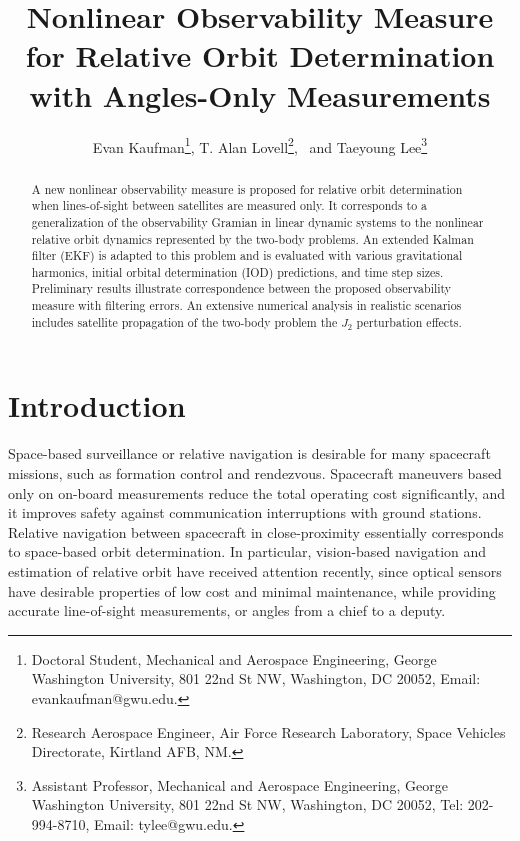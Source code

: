 \documentclass[letterpaper, preprint, paper,11pt]{AAS}	%
\begin{document}
\title{Nonlinear Observability Measure for Relative Orbit Determination with Angles-Only Measurements}

\author{Evan Kaufman\thanks{Doctoral Student, Mechanical and Aerospace Engineering, George Washington University, 801 22nd St NW, Washington, DC 20052, Email: evankaufman@gwu.edu.},  
T. Alan Lovell\thanks{Research Aerospace Engineer, Air Force Research Laboratory, Space Vehicles Directorate, Kirtland AFB, NM.},
\ and Taeyoung Lee\thanks{Assistant Professor, Mechanical and Aerospace Engineering, George Washington University, 801 22nd St NW, Washington, DC 20052, Tel: 202-994-8710, Email: tylee@gwu.edu.}
}


\maketitle{} 		


\begin{abstract}
A new nonlinear observability measure is proposed for relative orbit determination when lines-of-sight between satellites are measured only. It corresponds to a generalization of the observability Gramian in linear dynamic systems to the nonlinear relative orbit dynamics represented by the two-body problems. An extended Kalman filter (EKF) is adapted to this problem and is evaluated with various gravitational harmonics, initial orbital determination (IOD) predictions, and time step sizes. Preliminary results illustrate correspondence between the proposed observability measure with filtering errors. An extensive numerical analysis in realistic scenarios includes satellite propagation of the two-body problem the $J_2$ perturbation effects.
\end{abstract}


\section{Introduction}

Space-based surveillance or relative navigation is desirable for many spacecraft missions, such as formation control and rendezvous. Spacecraft maneuvers based only on on-board measurements reduce the total operating cost significantly, and it improves safety against communication interruptions with ground stations.  Relative navigation between spacecraft in close-proximity essentially corresponds to space-based orbit determination.  In particular, vision-based navigation and estimation of relative orbit have received attention recently, since optical sensors have desirable properties of low cost and minimal maintenance, while providing accurate line-of-sight measurements, or angles from a chief to a deputy.
\end{document}
